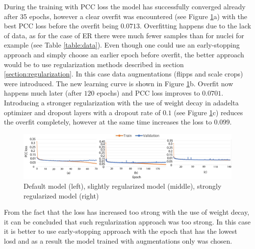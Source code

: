 During the training with PCC loss the model has successfully converged already after 35 epochs, however a clear overfit was encountered (see Figure \ref{fig:er-overfit}a) with the best PCC loss before the overfit being $0.0713$. Overfitting happens due to the lack of data, as for the case of ER there were much fewer samples than for nuclei for example (see Table \ref{table:data}). Even though one could use an early-stopping approach and simply choose an earlier epoch before overfit, the better approach would be to use regularization methods described in section \ref{section:regularization}. In this case data augmentations (flipps and scale crops) were introduced. The new learning curve is shown in Figure \ref{fig:er-overfit}b. Overfit now happens much later (after $120$ epochs) and PCC loss improves to $0.0701$. Introducing a stronger regularization with the use of weight decay in adadelta optimizer and dropout layers with a dropout rate of $0.1$ (see Figure \ref{fig:er-overfit}c) reduces the overfit completely, however at the same time increases the loss to $0.099$.
\begin{figure}[H]
	\begin{center}
		\includegraphics[width=\linewidth]{bilder/ER/segmentation/reg-not-reg.png}
		\caption{Default model (left), slightly regularized model (middle), strongly regularized model (right)}\label{fig:er-overfit}
	\end{center}
\end{figure}

From the fact that the loss has increased too strong with the use of weight decay, it can be concluded that such regularization approach was too strong. In this case it is better to use early-stopping approach with the epoch that has the lowest losd and as a result the model trained with augmentations only was chosen.

